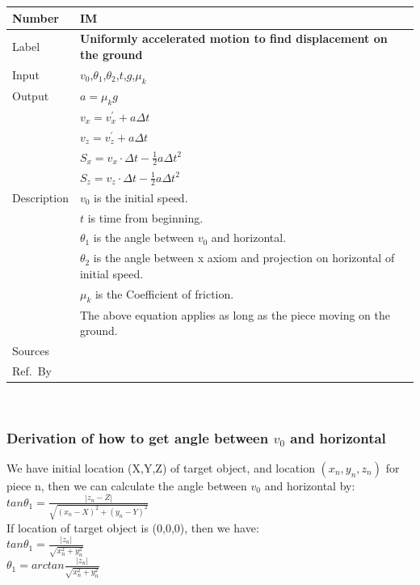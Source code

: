 \documentclass[12pt]{article}
\newcommand{\colAwidth}{0.13\textwidth}
\newcommand{\colBwidth}{0.82\textwidth}
\newcounter{instnum} %
\begin{document}
	\noindent
	\begin{minipage}{\textwidth}
		\renewcommand*{\arraystretch}{1.5}
		\begin{tabular}{| p{\colAwidth} | p{\colBwidth}|}
			\hline
			\rowcolor[gray]{0.9}
			Number& IM{instnum}\theinstnum \label{IM_DOG}\\
			\hline
			Label& \bf Uniformly accelerated motion to find displacement on the ground\\
			\hline
			Input&$v_{0}$,$\theta_{1}$,$\theta_{2}$,$t$,$g$,$\mu_{k}$\\
			\hline
			Output&$a=\mu_{k}g$\\
			&$v_{x} = v_{x}^{'} + a\Delta t$ \\
			&$v_{z} = v_{z}^{'} + a\Delta t$ \\
			&$S_{x}=v_{x}\cdot \Delta t-\frac{1}{2}a\Delta t^{2}$\\
			&$S_{z}=v_{z}\cdot \Delta t-\frac{1}{2}a\Delta t^{2}$\\
			\hline
			Description&$v_{0}$ is the initial speed.\\
			&$t$ is time from beginning.\\
			&$\theta _{1}$ is the angle between $v_{0}$ and horizontal.\\
			&$\theta _{2}$ is the angle between x axiom and projection on horizontal of initial speed.\\
			&$\mu_{k}$ is the Coefficient of friction.\\
			& The above equation applies as long as the piece moving on the ground.
			\\
			\hline
			Sources&~\ \ \\
			\hline
			Ref.\ By & \\
			\hline
		\end{tabular}
	\end{minipage}\\
	
	
	\subsubsection*{Derivation of how to get angle between $v_{0}$ and horizontal}
	
	We have initial location (X,Y,Z) of target object, and location $(x_{n},y_{n},z_{n})$ for piece n, then we can calculate the angle between $v_{0}$ and horizontal by:
	~\newline
	\\
	$tan\theta_{1}=\frac{|z_{n}-Z|}{\sqrt{(x_{n}-X)^{2}+(y_{n}-Y)^{2}}}$
	~\newline
	\\
	If location of target object is (0,0,0), then we have:
	~\newline
	\\
	$tan\theta_{1}=\frac{|z_{n}|}{\sqrt{x_{n}^{2}+y_{n}^{2}}}$
	~\newline
	\\
	$\theta_{1}=arctan \frac{|z_{n}|}{\sqrt{x_{n}^2+y_{n}^2}}$
	~\newline
	\\
	
\end{document}
